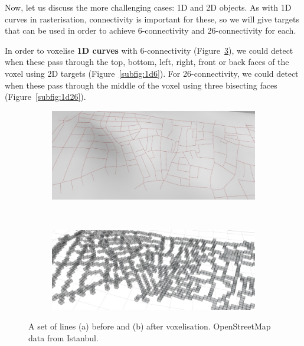 Now, let us discuss the more challenging cases: 1D and 2D objects.
As with 1D curves in rasterisation, connectivity is important for these, so we will give targets that can be used in order to achieve 6-connectivity and 26-connectivity for each.

In order to voxelise \textbf{1D curves} with 6-connectivity (Figure~\ref{fig:lines}), we could detect when these pass through the top, bottom, left, right, front or back faces of the voxel using 2D targets (Figure~\ref{subfig:1d6}).
For 26-connectivity, we could detect when these pass through the middle of the voxel using three bisecting faces (Figure~\ref{subfig:1d26}).

\begin{figure}
\centering
\begin{subfigure}[b]{\linewidth}
\includegraphics[width=\linewidth]{figs/lines-pre}
\caption{}%
\label{subfig:lines-pre}
\end{subfigure}
\\
\begin{subfigure}[b]{\linewidth}
\includegraphics[width=\linewidth]{figs/lines-post}
\caption{}%
\label{subfig:lines-post}
\end{subfigure}
\caption{A set of lines (a) before and (b) after voxelisation. OpenStreetMap data from Istanbul.}%
\label{fig:lines}
\end{figure}

